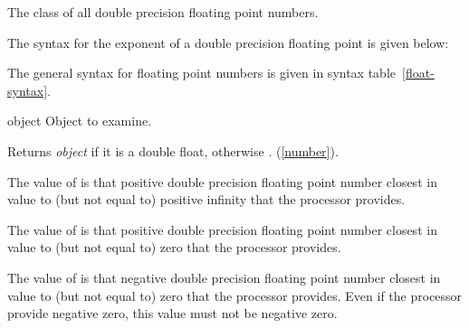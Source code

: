 \begin{optDefinition}
%
The class of all double precision floating point numbers.

The syntax for the exponent of a double precision floating point is given below:

%

The general syntax for floating point numbers is given in syntax
table~\ref{float-syntax}.

%
\begin{arguments}
    \item[object] Object to examine.
\end{arguments}
%
\result%
Returns {\em object\/} if it is a double float, otherwise \nil{}.
%
\seealso%
 (\ref{number}).

%
\remarks%
The value of  is that positive double
precision floating point number closest in value to (but not equal to) positive
infinity that the processor provides.

%
\remarks%
The value of  is that positive double
precision floating point number closest in value to (but not equal to) zero that
the processor provides.

%
\remarks%
The value of  is that negative double
precision floating point number closest in value to (but not equal to) zero that
the processor provides.  Even if the processor provide negative zero, this value
must not be negative zero.


\end{optDefinition}
